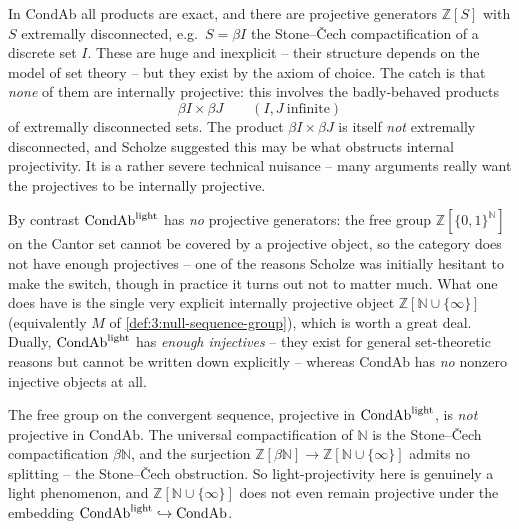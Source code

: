 \begin{remark}
\label{rmk:3:condab-projectives}
In $\mathrm{CondAb}$ all products are exact, and there are projective generators
$\mathbb{Z}[S]$ with $S$ extremally disconnected, e.g.\ $S=\beta I$ the
Stone--\v{C}ech compactification of a discrete set $I$. These are huge and
inexplicit -- their structure depends on the model of set theory -- but they
exist by the axiom of choice. The catch is that \emph{none} of them are
internally projective: this involves the badly-behaved products
\begin{equation*}
\beta I\times\beta J\qquad(I,J\ \text{infinite})
\end{equation*}
of extremally disconnected sets. The product $\beta I\times\beta J$ is itself
\emph{not} extremally disconnected, and Scholze suggested this may be what
obstructs internal projectivity. It is a rather severe technical nuisance --
many arguments really want the projectives to be internally projective.
\end{remark}

\begin{remark}
\label{rmk:3:light-proj-inj}
By contrast $\mathrm{CondAb}^{\mathrm{light}}$ has \emph{no} projective generators: the free group
$\mathbb{Z}[\{0,1\}^{\mathbb{N}}]$ on the Cantor set cannot be covered by a
projective object, so the category does not have enough projectives -- one of
the reasons Scholze was initially hesitant to make the switch, though in practice
it turns out not to matter much. What one does have is the single very explicit
internally projective object $\mathbb{Z}[\mathbb{N}\cup\{\infty\}]$
(equivalently $M$ of \cref{def:3:null-sequence-group}), which is worth a great
deal. Dually, $\mathrm{CondAb}^{\mathrm{light}}$ has \emph{enough injectives} -- they exist for general
set-theoretic reasons but cannot be written down explicitly -- whereas
$\mathrm{CondAb}$ has \emph{no} nonzero injective objects at all.
\end{remark}

\begin{remark}
\label{rmk:3:not-projective-all}
The free group on the convergent sequence, projective in $\mathrm{CondAb}^{\mathrm{light}}$, is
\emph{not} projective in $\mathrm{CondAb}$. The universal compactification of
$\mathbb{N}$ is the Stone--\v{C}ech compactification $\beta\mathbb{N}$, and the
surjection $\mathbb{Z}[\beta\mathbb{N}]\to\mathbb{Z}[\mathbb{N}\cup\{\infty\}]$
admits no splitting -- the Stone--\v{C}ech obstruction. So light-projectivity
here is genuinely a light phenomenon, and $\mathbb{Z}[\mathbb{N}\cup\{\infty\}]$
does not even remain projective under the embedding $\mathrm{CondAb}^{\mathrm{light}}\hookrightarrow
\mathrm{CondAb}$.
\end{remark}

